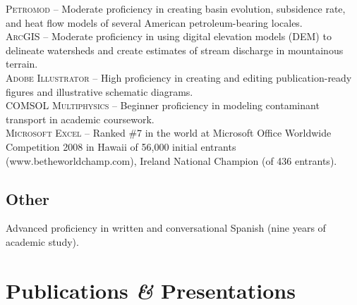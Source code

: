\documentclass[11pt, letterpaper]{article}
\newcommand{\amper}{{\fontspec[Scale=.95]{Adobe Caslon Pro}\selectfont\itshape\&}}
\begin{document}
\textsc{Petromod} – Moderate proficiency in creating basin evolution, subsidence rate, and heat flow models of several American petroleum-bearing locales.\\[5pt] 
\textsc{ArcGIS} – Moderate proficiency in using digital elevation models (DEM) to delineate watersheds and create estimates of stream discharge in mountainous terrain.\\[5pt] 
\textsc{Adobe Illustrator} – High proficiency in creating and editing publication-ready figures and illustrative schematic diagrams.\\[5pt] 
\textsc{COMSOL Multiphysics} – Beginner proficiency in modeling contaminant transport in academic coursework.\\[5pt] 
\textsc{Microsoft Excel} – Ranked \#7 in the world at Microsoft Office Worldwide Competition 2008 in Hawaii of 56,000 initial entrants (www.betheworldchamp.com), Ireland National Champion (of 436 entrants).
\subsection*{Other}
\noindent
Advanced proficiency in written and conversational Spanish (nine years of academic study).


\section*{Publications \amper{} Presentations}
\label{sec:pubs}  %

\end{document}
